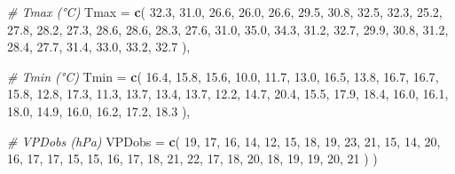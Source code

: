 \documentclass[
]{article}
\newenvironment{Shaded}{\begin{snugshade}}{\end{snugshade}}
\newcommand{\AttributeTok}[1]{\textcolor[rgb]{0.13,0.29,0.53}{#1}}
\newcommand{\CommentTok}[1]{\textcolor[rgb]{0.56,0.35,0.01}{\textit{#1}}}
\newcommand{\DecValTok}[1]{\textcolor[rgb]{0.00,0.00,0.81}{#1}}
\newcommand{\FloatTok}[1]{\textcolor[rgb]{0.00,0.00,0.81}{#1}}
\newcommand{\FunctionTok}[1]{\textcolor[rgb]{0.13,0.29,0.53}{\textbf{#1}}}
\newcommand{\NormalTok}[1]{#1}
\begin{document}
\begin{Shaded}
\begin{Highlighting}[]
  \CommentTok{\# Tmax (°C)}
  \AttributeTok{Tmax =} \FunctionTok{c}\NormalTok{( }
    \FloatTok{32.3}\NormalTok{, }\FloatTok{31.0}\NormalTok{, }\FloatTok{26.6}\NormalTok{, }\FloatTok{26.0}\NormalTok{, }\FloatTok{26.6}\NormalTok{, }\FloatTok{29.5}\NormalTok{, }
    \FloatTok{30.8}\NormalTok{, }\FloatTok{32.5}\NormalTok{, }\FloatTok{32.3}\NormalTok{, }\FloatTok{25.2}\NormalTok{, }\FloatTok{27.8}\NormalTok{, }\FloatTok{28.2}\NormalTok{, }
    \FloatTok{27.3}\NormalTok{, }\FloatTok{28.6}\NormalTok{, }\FloatTok{28.6}\NormalTok{, }\FloatTok{28.3}\NormalTok{, }\FloatTok{27.6}\NormalTok{, }\FloatTok{31.0}\NormalTok{, }
    \FloatTok{35.0}\NormalTok{, }\FloatTok{34.3}\NormalTok{, }\FloatTok{31.2}\NormalTok{, }\FloatTok{32.7}\NormalTok{, }\FloatTok{29.9}\NormalTok{, }\FloatTok{30.8}\NormalTok{, }
    \FloatTok{31.2}\NormalTok{, }\FloatTok{28.4}\NormalTok{, }\FloatTok{27.7}\NormalTok{, }\FloatTok{31.4}\NormalTok{, }\FloatTok{33.0}\NormalTok{, }\FloatTok{33.2}\NormalTok{, }\FloatTok{32.7}
\NormalTok{  ),}
  
  \CommentTok{\# Tmin (°C)}
  \AttributeTok{Tmin =} \FunctionTok{c}\NormalTok{( }
    \FloatTok{16.4}\NormalTok{, }\FloatTok{15.8}\NormalTok{, }\FloatTok{15.6}\NormalTok{, }\FloatTok{10.0}\NormalTok{, }\FloatTok{11.7}\NormalTok{, }\FloatTok{13.0}\NormalTok{, }
    \FloatTok{16.5}\NormalTok{, }\FloatTok{13.8}\NormalTok{, }\FloatTok{16.7}\NormalTok{, }\FloatTok{16.7}\NormalTok{, }\FloatTok{15.8}\NormalTok{, }\FloatTok{12.8}\NormalTok{, }
    \FloatTok{17.3}\NormalTok{, }\FloatTok{11.3}\NormalTok{, }\FloatTok{13.7}\NormalTok{, }\FloatTok{13.4}\NormalTok{, }\FloatTok{13.7}\NormalTok{, }\FloatTok{12.2}\NormalTok{, }
    \FloatTok{14.7}\NormalTok{, }\FloatTok{20.4}\NormalTok{, }\FloatTok{15.5}\NormalTok{, }\FloatTok{17.9}\NormalTok{, }\FloatTok{18.4}\NormalTok{, }\FloatTok{16.0}\NormalTok{, }
    \FloatTok{16.1}\NormalTok{, }\FloatTok{18.0}\NormalTok{, }\FloatTok{14.9}\NormalTok{, }\FloatTok{16.0}\NormalTok{, }\FloatTok{16.2}\NormalTok{, }\FloatTok{17.2}\NormalTok{, }\FloatTok{18.3}
\NormalTok{  ),}
  
  \CommentTok{\# VPDobs (hPa)}
  \AttributeTok{VPDobs =} \FunctionTok{c}\NormalTok{( }
    \DecValTok{19}\NormalTok{, }\DecValTok{17}\NormalTok{, }\DecValTok{16}\NormalTok{, }\DecValTok{14}\NormalTok{, }\DecValTok{12}\NormalTok{, }\DecValTok{15}\NormalTok{, }
    \DecValTok{18}\NormalTok{, }\DecValTok{19}\NormalTok{, }\DecValTok{23}\NormalTok{, }\DecValTok{21}\NormalTok{, }\DecValTok{15}\NormalTok{, }\DecValTok{14}\NormalTok{, }
    \DecValTok{20}\NormalTok{, }\DecValTok{16}\NormalTok{, }\DecValTok{17}\NormalTok{, }\DecValTok{17}\NormalTok{, }\DecValTok{15}\NormalTok{, }\DecValTok{15}\NormalTok{, }
    \DecValTok{16}\NormalTok{, }\DecValTok{17}\NormalTok{, }\DecValTok{18}\NormalTok{, }\DecValTok{21}\NormalTok{, }\DecValTok{22}\NormalTok{, }\DecValTok{17}\NormalTok{, }
    \DecValTok{18}\NormalTok{, }\DecValTok{20}\NormalTok{, }\DecValTok{18}\NormalTok{, }\DecValTok{19}\NormalTok{, }\DecValTok{19}\NormalTok{, }\DecValTok{20}\NormalTok{, }\DecValTok{21}
\NormalTok{  )}
\NormalTok{)}


\end{Highlighting}
\end{Shaded}
\end{document}
